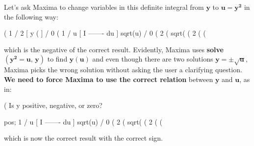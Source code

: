 \documentclass[12pt]{article}
\begin{document}
\noindent Let's ask Maxima to change variables in this definite integral
  from $\mathbf{y}$ to $\mathbf{u = y^2}$ in the following way:
\begin{myVerbatim}
(%
                                   1
                                  /     2
                                  [    y
(%
                                  ]
                                  /
                                   0
(%
                                   1
                                  /      u
                                  [    %
                                  I  ------- du
                                  ]  sqrt(u)
                                  /
                                   0
(%
                                        2
(%
                             sqrt(%
(%
                                      2
(%
(%
\end{myVerbatim}
   which is the negative of the correct result.
Evidently, Maxima uses \textbf{solve}$\mathbf{(y^2 = u,\,y)}$ to find $\mathbf{y(u)}$ and even though
  there are two solutions $\mathbf{ y = \pm \sqrt{u} }$, Maxima picks the wrong solution
  without asking the user a clarifying question.
\textbf{We need to force Maxima to use the correct relation} between $\mathbf{y}$ and $\mathbf{u}$, as in:
\begin{myVerbatim}
(%
Is  y  positive, negative, or zero?

pos;
                                  1
                                 /      u
                                 [    %
                                 I  ------- du
                                 ]  sqrt(u)
                                 /
                                  0
(%
                                       2
(%
                              sqrt(%
(%
                                       2
(%
(%
\end{myVerbatim}
which is now the correct result with the correct sign.
\end{document}
